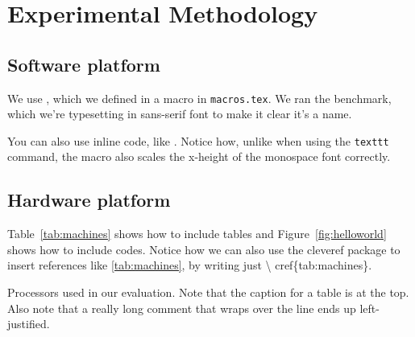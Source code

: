 \chapter{Experimental Methodology}
\label{cha:methodology}

\section{Software platform}
\label{sec:softplat}

We use \jikesrvm, which we defined in a macro in
\texttt{macros.tex}. We ran the \avrora benchmark, which we're
typesetting in sans-serif font to make it clear it's a name.

You can also use inline code, like . Notice how, unlike when
using the \texttt{texttt} command, the  macro also scales the
x-height of the monospace font correctly.

\section{Hardware platform}
\label{sec:hardplat}

Table~\ref{tab:machines} shows how to include tables and
Figure~\ref{fig:helloworld} shows how to include codes. Notice how we
can also use the \textsf{cleveref} package to insert references like
\cref{tab:machines}, by writing just \textbackslash
cref\{tab:machines\}.

\begin{table*}
  \centering

  \caption{Processors used in our evaluation.  Note that the caption
    for a table is at the top.  Also note that a really long comment
    that wraps over the line ends up left-justified.}
  
  \label{tab:machines}
  
\end{table*}

%       

%       




